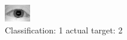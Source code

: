 \begin{figure}[h!]
\begin{center}
\includegraphics[width=0.60\columnwidth]{figures/ID1007_class_1_target_2.png}
\end{center}
\caption{ Classification: 1 actual target: 2}
\label{fig:ID1007_class_1_target_2}
\end{figure}
